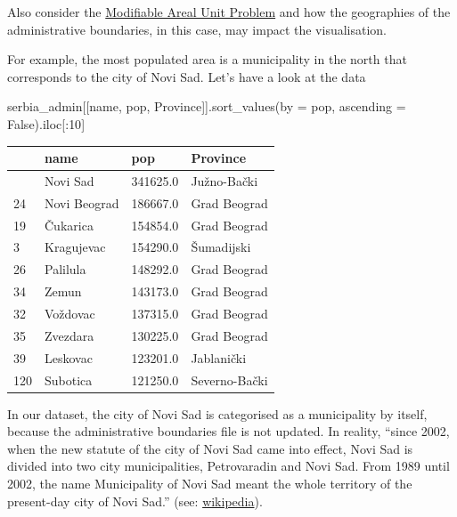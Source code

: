 \documentclass[
  letterpaper,
  DIV=11,
  numbers=noendperiod]{scrreprt}
\newenvironment{Shaded}{\begin{snugshade}}{\end{snugshade}}
\newcommand{\DecValTok}[1]{\textcolor[rgb]{0.68,0.00,0.00}{#1}}
\newcommand{\NormalTok}[1]{\textcolor[rgb]{0.00,0.23,0.31}{#1}}
\newcommand{\OperatorTok}[1]{\textcolor[rgb]{0.37,0.37,0.37}{#1}}
\newcommand{\StringTok}[1]{\textcolor[rgb]{0.13,0.47,0.30}{#1}}
\newcommand{\VariableTok}[1]{\textcolor[rgb]{0.07,0.07,0.07}{#1}}
\begin{document}
Also consider the
\href{https://en.wikipedia.org/wiki/Modifiable_areal_unit_problem}{Modifiable
Areal Unit Problem} and how the geographies of the administrative
boundaries, in this case, may impact the visualisation.

For example, the most populated area is a municipality in the north that
corresponds to the city of Novi Sad. Let's have a look at the data

\begin{Shaded}
\begin{Highlighting}[]
\NormalTok{serbia\_admin[[}\StringTok{\textquotesingle{}name\textquotesingle{}}\NormalTok{, }\StringTok{\textquotesingle{}pop\textquotesingle{}}\NormalTok{, }\StringTok{\textquotesingle{}Province\textquotesingle{}}\NormalTok{]].sort\_values(by }\OperatorTok{=} \StringTok{\textquotesingle{}pop\textquotesingle{}}\NormalTok{, ascending }\OperatorTok{=} \VariableTok{False}\NormalTok{).iloc[:}\DecValTok{10}\NormalTok{]}
\end{Highlighting}
\end{Shaded}

\begin{longtable}[]{@{}llll@{}}
\toprule\noalign{}
& name & pop & Province \\
\midrule\noalign{}
\endhead
\bottomrule\noalign{}
\endlastfoot
48 & Novi Sad & 341625.0 & Južno-Bački \\
24 & Novi Beograd & 186667.0 & Grad Beograd \\
19 & Čukarica & 154854.0 & Grad Beograd \\
3 & Kragujevac & 154290.0 & Šumadijski \\
26 & Palilula & 148292.0 & Grad Beograd \\
34 & Zemun & 143173.0 & Grad Beograd \\
32 & Voždovac & 137315.0 & Grad Beograd \\
35 & Zvezdara & 130225.0 & Grad Beograd \\
39 & Leskovac & 123201.0 & Jablanički \\
120 & Subotica & 121250.0 & Severno-Bački \\
\end{longtable}

In our dataset, the city of Novi Sad is categorised as a municipality by
itself, because the administrative boundaries file is not updated. In
reality, ``since 2002, when the new statute of the city of Novi Sad came
into effect, Novi Sad is divided into two city municipalities,
Petrovaradin and Novi Sad. From 1989 until 2002, the name Municipality
of Novi Sad meant the whole territory of the present-day city of Novi
Sad.'' (see:
\href{https://en.wikipedia.org/wiki/City_municipality_of_Novi_Sad}{wikipedia}).
\end{document}
